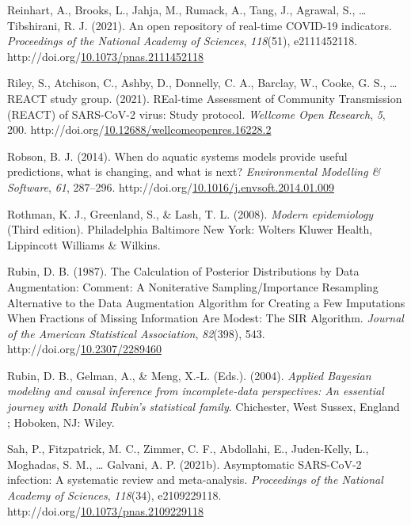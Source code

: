 \documentclass[12pt,twoside]{smiththesis}
\newlength{\cslhangindent}
\newenvironment{CSLReferences}[2] %
 {%
\setlength{\parindent}{0pt}
\ifodd #1 \everypar{\setlength{\hangindent}{\cslhangindent}}\ignorespaces\fi
\ifnum #2 > 0
\setlength{\parskip}{#2\baselineskip}
  \fi
}%
{}
\begin{document}
\begin{CSLReferences}{1}{0}
\leavevmode{}%
Reinhart, A., Brooks, L., Jahja, M., Rumack, A., Tang, J., Agrawal, S., \ldots{} Tibshirani, R. J. (2021). An open repository of real-time {COVID-19} indicators. \emph{Proceedings of the National Academy of Sciences}, \emph{118}(51), e2111452118. http://doi.org/\href{https://doi.org/10.1073/pnas.2111452118}{10.1073/pnas.2111452118}

\leavevmode{}%
Riley, S., Atchison, C., Ashby, D., Donnelly, C. A., Barclay, W., Cooke, G. S., \ldots{} REACT study group. (2021). {REal-time Assessment} of {Community Transmission} ({REACT}) of {SARS-CoV-2} virus: {Study} protocol. \emph{Wellcome Open Research}, \emph{5}, 200. http://doi.org/\href{https://doi.org/10.12688/wellcomeopenres.16228.2}{10.12688/wellcomeopenres.16228.2}

\leavevmode{}%
Robson, B. J. (2014). When do aquatic systems models provide useful predictions, what is changing, and what is next? \emph{Environmental Modelling \& Software}, \emph{61}, 287--296. http://doi.org/\href{https://doi.org/10.1016/j.envsoft.2014.01.009}{10.1016/j.envsoft.2014.01.009}

\leavevmode{}%
Rothman, K. J., Greenland, S., \& Lash, T. L. (2008). \emph{Modern epidemiology} (Third edition). {Philadelphia Baltimore New York}: {Wolters Kluwer Health, Lippincott Williams \& Wilkins}.

\leavevmode{}%
Rubin, D. B. (1987). The {Calculation} of {Posterior Distributions} by {Data Augmentation}: {Comment}: {A Noniterative Sampling}/{Importance Resampling Alternative} to the {Data Augmentation Algorithm} for {Creating} a {Few Imputations When Fractions} of {Missing Information Are Modest}: {The SIR Algorithm}. \emph{Journal of the American Statistical Association}, \emph{82}(398), 543. http://doi.org/\href{https://doi.org/10.2307/2289460}{10.2307/2289460}

\leavevmode{}%
Rubin, D. B., Gelman, A., \& Meng, X.-L. (Eds.). (2004). \emph{Applied {Bayesian} modeling and causal inference from incomplete-data perspectives: An essential journey with {Donald Rubin}'s statistical family}. {Chichester, West Sussex, England ; Hoboken, NJ}: {Wiley}.

\leavevmode{}%
Sah, P., Fitzpatrick, M. C., Zimmer, C. F., Abdollahi, E., Juden-Kelly, L., Moghadas, S. M., \ldots{} Galvani, A. P. (2021b). Asymptomatic {SARS-CoV-2} infection: {A} systematic review and meta-analysis. \emph{Proceedings of the National Academy of Sciences}, \emph{118}(34), e2109229118. http://doi.org/\href{https://doi.org/10.1073/pnas.2109229118}{10.1073/pnas.2109229118}


\end{CSLReferences}
\end{document}
